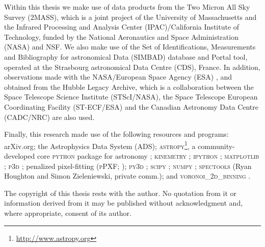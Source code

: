 \begin{originalitylong}
Within this thesis we make use of data products from the Two Micron All Sky Survey (2MASS), which is a joint project of the University of Massachusetts and the Infrared Processing and Analysis Center (IPAC)/California Institute of Technology, funded by the National Aeronautics and Space Administration (NASA) and NSF. We also make use of the Set of Identifications, Measurements and Bibliography for astronomical Data (SIMBAD) database and Portal tool, operated at the Strasbourg astronomical Data Centre (CDS), France. In addition, observations made with the NASA/European Space Agency (ESA) , and obtained from the Hubble Legacy Archive, which is a collaboration between the Space Telescope Science Institute (STScI/NASA), the Space Telescope European Coordinating Facility (ST-ECF/ESA) and the Canadian Astronomy Data Centre (CADC/NRC) are also used.

Finally, this research made use of the following resources and programs: arXiv.org; the Astrophysics Data System (ADS); \textsc{astropy}\footnote{\url{http://www.astropy.org}}, a community-developed core \textsc{python} package for astronomy \citep{TheAstropyCollaboration2013}; \textsc{kinemetry} \citep{Krajnovic2006}; \textsc{ipython} \citep{Perez2007}; \textsc{matplotlib} \citep{Hunter2007}; \textsc{p3d} \citep{Sandin2010, Sandin2011}; penalized pixel-fitting (\textsc{pPXF}; \citealt{Cappellari2004}); \textsc{py3d} \citep{Sanchez2011, Husemann2013, Husemann2014}; \textsc{scipy} \citep{Oliphant2007, Millman2011}; \textsc{numpy} \citep{VanderWalt2011}; \textsc{spectools} (Ryan Houghton and Simon Zieleniewski, private comm.); and \textsc{voronoi\_2d\_binning} \citep[including the SAURON colourmaps; ][]{Cappellari2003}.

The copyright of this thesis rests with the author. No quotation from it or information derived from it may be published without acknowledgment and, where appropriate, consent of its author.
\end{originalitylong}